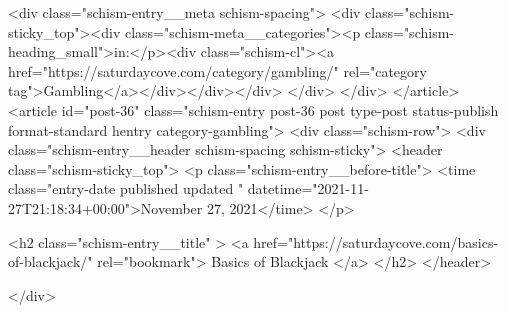 {		<div class="schism-entry__meta schism-spacing">			<div class="schism-sticky_top"><div class="schism-meta__categories"><p class="schism-heading_small">in:</p><div class="schism-cl"><a href="https://saturdaycove.com/category/gambling/" rel="category tag">Gambling</a></div></div></div>		</div>
	</div>
</article>
<article id="post-36" class="schism-entry post-36 post type-post status-publish format-standard hentry category-gambling">
	<div class="schism-row">		<div class="schism-entry__header schism-spacing schism-sticky">			<header class="schism-sticky_top">				<p class="schism-entry__before-title">
					<time class="entry-date published updated " datetime="2021-11-27T21:18:34+00:00">November 27, 2021</time>				</p>

				<h2 class="schism-entry__title" >
					<a href="https://saturdaycove.com/basics-of-blackjack/" rel="bookmark">
						Basics of Blackjack					</a>
				</h2>
			</header>

					</div>

}
